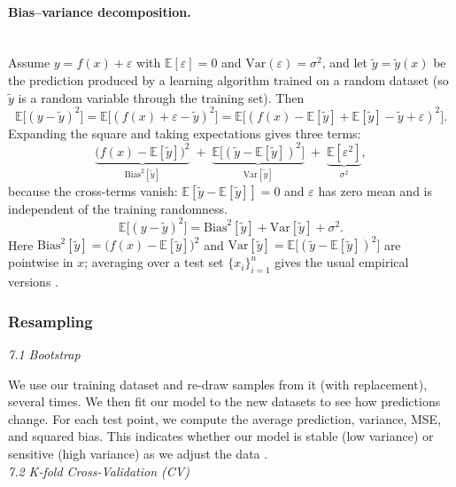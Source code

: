 \documentclass[amssymb,twocolumn,aps,floatfix]{revtex4-2}
\begin{document}
\paragraph*{Bias--variance decomposition.} \\

Assume $y=f(x)+\varepsilon$ with $\mathbb{E}[\varepsilon]=0$ and $\mathrm{Var}(\varepsilon)=\sigma^2$, and let $\tilde y=\tilde y(x)$ be the prediction produced by a learning algorithm trained on a random dataset (so $\tilde y$ is a random variable through the training set). Then
\[
\mathbb{E}\big[(y-\tilde y)^2\big]
=\mathbb{E}\big[(f(x)+\varepsilon-\tilde y)^2\big]
=\mathbb{E}\big[(f(x)-\mathbb{E}[\tilde y]+\mathbb{E}[\tilde y]-\tilde y+\varepsilon)^2\big].
\]
Expanding the square and taking expectations gives three terms:
\[
\underbrace{\big(f(x)-\mathbb{E}[\tilde y]\big)^2}_{\text{Bias}^2[\tilde y]}
\;+\;
\underbrace{\mathbb{E}\big[(\tilde y-\mathbb{E}[\tilde y])^2\big]}_{\mathrm{Var}[\tilde y]}
\;+\;
\underbrace{\mathbb{E}[\varepsilon^2]}_{\sigma^2},
\]
because the cross-terms vanish: $\mathbb{E}[\tilde y-\mathbb{E}[\tilde y]]=0$ and $\varepsilon$ has zero mean and is independent of the training randomness. 
\[
\boxed{\;
\mathbb{E}\big[(y-\tilde y)^2\big]
= \mathrm{Bias}^2[\tilde y] + \mathrm{Var}[\tilde y] + \sigma^2. \;}
\]
Here $\mathrm{Bias}^2[\tilde y]=\big(f(x)-\mathbb{E}[\tilde y]\big)^2$ and $\mathrm{Var}[\tilde y]=\mathbb{E}\big[(\tilde y-\mathbb{E}[\tilde y])^2\big]$ are pointwise in $x$; averaging over a test set $\{x_i\}_{i=1}^n$ gives the usual empirical versions \cite{compfys38}.\\



\subsubsection{Resampling}
\label{subsubsec:error_theory}

\textit{7.1 Bootstrap}

We use our training dataset and re-draw samples from it (with replacement), several times. We then fit our model to the new datasets to see how predictions change. For each test point, we compute the average prediction, variance, MSE, and squared bias. This indicates whether our model is stable (low variance) or sensitive (high variance) as we adjust the data \cite{compfys38}. \\

\textit{7.2 K-fold Cross-Validation (CV)}
\end{document}
